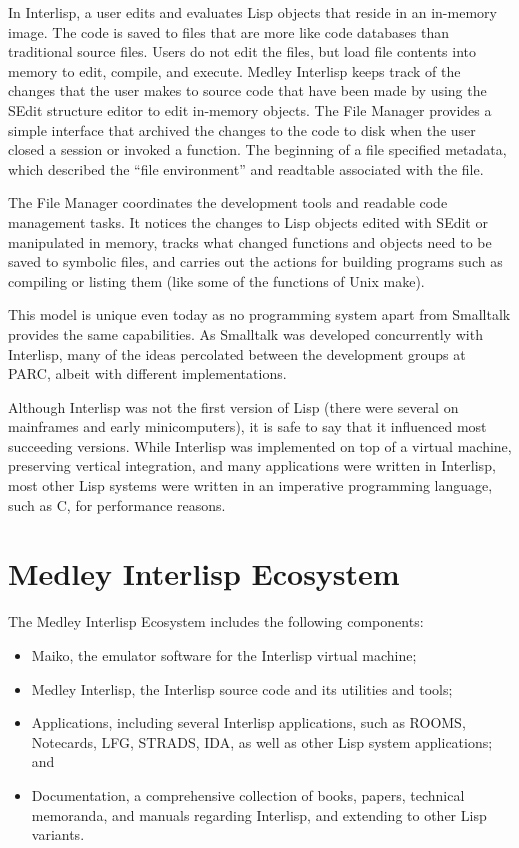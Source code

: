 \documentclass[sigconf]{acmart}
\begin{document}
In Interlisp, a user edits and evaluates Lisp objects that reside in an in-memory image. The code is saved to files that are more like code databases than traditional source files. Users do not edit the files, but load file contents into memory to edit, compile, and execute. Medley Interlisp keeps track of the changes that the user makes to source code that have been made by using the SEdit structure editor to edit in-memory objects. The File Manager provides a simple interface that archived the changes to the code to disk when the user closed a session or invoked a function. The beginning of a file specified metadata, which described the ``file environment'' and readtable associated with the file.

The File Manager coordinates the development tools and readable code management tasks. It notices the changes to Lisp objects edited with SEdit or manipulated in memory, tracks what changed functions and objects need to be saved to symbolic files, and carries out the actions for building programs such as compiling or listing them (like some of the functions of Unix make).

This model is unique even today as no programming system apart from Smalltalk provides the same capabilities. As Smalltalk was developed concurrently with Interlisp, many of the ideas percolated between the development groups at PARC, albeit with different implementations.

Although Interlisp was not the first version of Lisp (there were several on mainframes and early minicomputers), it is safe to say that it influenced most succeeding versions. While Interlisp was implemented on top of a virtual machine, preserving vertical integration, and many applications were written in Interlisp, most other Lisp systems were written in an imperative programming language, such as C, for performance reasons.

\section{Medley Interlisp Ecosystem}

The Medley Interlisp Ecosystem includes the following components:

\begin{itemize}
  \item Maiko, the emulator software for the Interlisp virtual machine;
  \item Medley Interlisp, the Interlisp source code and its utilities and tools;
  \item Applications, including several Interlisp applications, such as ROOMS, Notecards, LFG, STRADS, IDA, as well as other Lisp system applications; and
  \item Documentation, a comprehensive collection of books, papers, technical memoranda, and manuals regarding Interlisp, and extending to other Lisp variants.
\end{itemize}
\end{document}
